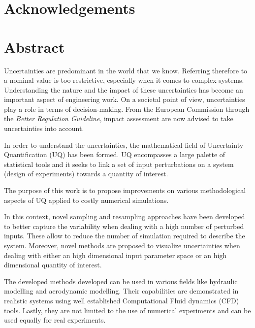 
\cleardoublepage
\section*{Acknowledgements}



\newpage
\section*{Abstract}

Uncertainties are predominant in the world that we know. Referring therefore to a nominal value is too restrictive, especially when it comes to complex systems. Understanding the nature and the impact of these uncertainties has become an important aspect of engineering work. On a societal point of view, uncertainties play a role in terms of decision-making. From the European Commission through the \emph{Better Regulation Guideline}, impact assessment are now advised to take uncertainties into account.

In order to understand the uncertainties, the mathematical field of Uncertainty Quantification (UQ) has been formed. UQ encompasses a large palette of statistical tools and it seeks to link a set of input perturbations on a system (design of experiments) towards a quantity of interest.

The purpose of this work is to propose improvements on various methodological aspects of UQ applied to costly numerical simulations. 


In this context, novel sampling and resampling approaches have been developed to better capture the variability when dealing with a high number of perturbed inputs. These allow to reduce the number of simulation required to describe the system. Moreover, novel methods are proposed to visualize uncertainties when dealing with either an high dimensional input parameter space or an high dimensional quantity of interest.

The developed methods developed can be used in various fields like hydraulic modelling and aerodynamic modelling. Their capabilities are demonstrated in realistic systems using well established Computational Fluid dynamics (CFD) tools. Lastly, they are not limited to the use of numerical experiments and can be used equally for real experiments.\\


